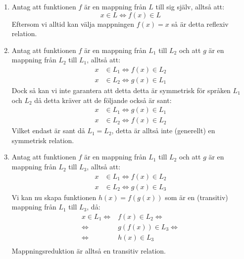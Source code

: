 \documentclass{article}
\begin{document}
\begin{enumerate}[label=(\alph*)]
    \item
        Antag att funktionen $f$ är en mappning från $L$ till sig själv, alltså att:
        $$x \in L \iff f(x) \in L$$
        Eftersom vi alltid kan välja mappningen $f(x)=x$ så är detta reflexiv relation.
    
    \item 
        Antag att funktionen $f$ är en mappning från $L_1$ till $L_2$ och att $g$ är en mappning från $L_2$ till $L_1$, alltså att: 
         \begin{align*}
            x & \in L_1 \iff f(x) \in L_2 \\
            x & \in L_2 \iff g(x) \in L_1
        \end{align*}
        Dock så kan vi inte garantera att detta detta är symmetrisk för språken $L_1$ och $L_2$ då detta kräver att de följande också är sant:
        \begin{align*}
            x & \in L_1 \iff g(x) \in L_1 \\
            x & \in L_2 \iff f(x) \in L_2
        \end{align*}
        Vilket endast är sant då $L_1 = L_2$, detta är alltså inte (generellt) en  symmetrisk relation.
        
    \item 
        Antag att funktionen $f$ är en mappning från $L_1$ till $L_2$ och att $g$ är en mappning från $L_2$ till $L_3$, alltså att:
        \begin{align*}
            x & \in L_1 \iff f(x) \in L_2 \\
            x & \in L_2 \iff g(x) \in L_3
        \end{align*}
        Vi kan nu skapa funktionen $h(x) = f(g(x))$ som är en (transitiv) mappning från $L_1$ till $L_3$, då:
        \begin{align*}
            x \in L_1 \iff &f(x) \in L_2 \iff \\
            \iff &g(f(x)) \in L_3 \iff \\ 
            \iff &h(x) \in L_3 \\
        \end{align*}
        Mappningsreduktion är alltså en transitiv relation.
        
        


\end{enumerate}
\end{document}

